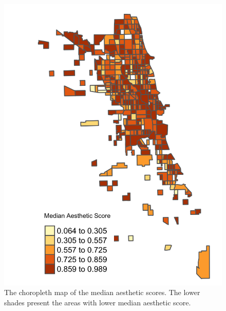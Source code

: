 \begin{figure}[htbp]
\begin{center}
\includegraphics[scale=0.2]{pics/score.png}
\caption{The choropleth map of the median aesthetic scores. The lower shades present the areas with lower median aesthetic score. }
\label{fig:score}
\end{center}
\end{figure}




